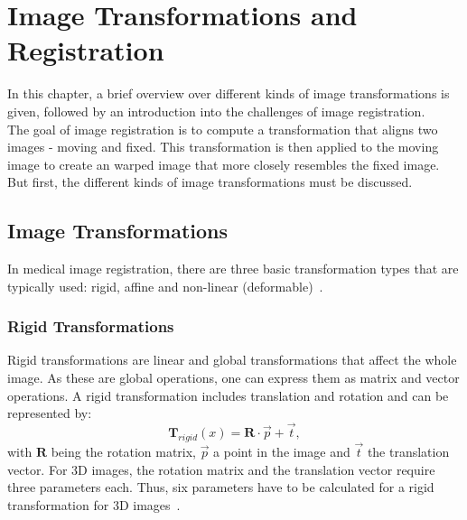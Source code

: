 \section{Image Transformations and Registration} \label{Sec:ImageTransformationsAndRegistration}
In this chapter, a brief overview over different kinds of image transformations is given, followed by an introduction into the challenges of image registration.\\
The goal of image registration is to compute a transformation that aligns two images - moving and fixed. This transformation is then applied to the moving image to create an warped image that more closely resembles the fixed image. But first, the different kinds of image transformations must be discussed.

\subsection{Image Transformations} \label{SubSec:ImageTransformations}
In medical image registration, there are three basic transformation types that are typically used: rigid, affine and non-linear (deformable)~\cite{Strittmatter2023}.

\subsubsection{Rigid Transformations}
Rigid transformations are linear and global transformations that affect the whole image. As these are global operations, one can express them as matrix and vector operations. A rigid transformation includes translation and rotation and can be represented by:
\begin{equation}
	\mathbf{T}_{rigid} (x) = \mathbf{R} \cdot \overrightarrow{p} + \overrightarrow{t},
\end{equation}
with $\mathbf{R}$ being the rotation matrix, $\overrightarrow{p}$ a point in the image and $\overrightarrow{t}$ the translation vector.  For 3D images, the rotation matrix and the translation vector require three parameters each. Thus, six parameters have to be calculated for a rigid transformation for 3D images~\cite{Strittmatter2023}.

